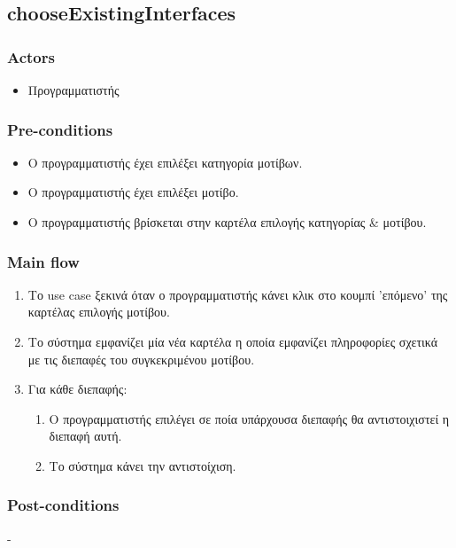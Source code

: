 \documentclass[../diploma_thesis.tex]{subfiles}
\begin{document}
\subsection{chooseExistingInterfaces}
\subsubsection{Actors}
\begin{itemize}
\item  Προγραμματιστής
\end{itemize}
\subsubsection{Pre-conditions}
\begin{itemize}
\item Ο προγραμματιστής έχει επιλέξει κατηγορία μοτίβων.
\item  Ο προγραμματιστής έχει επιλέξει μοτίβο.
\item Ο προγραμματιστής βρίσκεται στην καρτέλα επιλογής κατηγορίας \& μοτίβου.
\end{itemize}
\subsubsection{Main flow}
\begin{enumerate}
\item Το use case ξεκινά όταν ο προγραμματιστής κάνει κλικ στο κουμπί 'επόμενο' της καρτέλας επιλογής μοτίβου.
\item Το σύστημα εμφανίζει μία νέα καρτέλα η οποία εμφανίζει πληροφορίες σχετικά με τις διεπαφές του συγκεκριμένου μοτίβου.
\item Για κάθε διεπαφής:\begin{enumerate}
\item Ο προγραμματιστής επιλέγει σε ποία υπάρχουσα διεπαφής θα αντιστοιχιστεί η διεπαφή αυτή.
\item Το σύστημα κάνει την αντιστοίχιση.
\end{enumerate}
\end{enumerate}
\subsubsection{Post-conditions}
-
\end{document}
